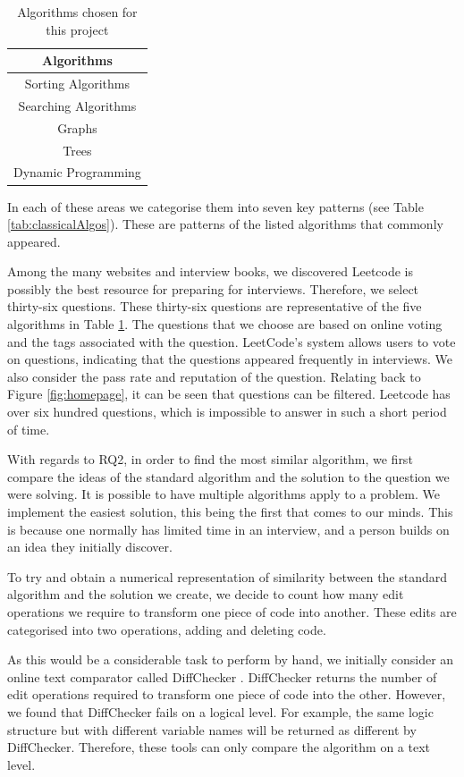 \documentclass[conference]{IEEEtran}
\begin{document}
\begin{table}[H]
\centering
	\begin{tabular}{| c | } \hline
		  {\bf Algorithms} \\ \hline
		Sorting Algorithms\\ \hline
		Searching Algorithms\\ \hline
		Graphs  \\ \hline
		Trees  \\ \hline
		Dynamic Programming \\ \hline
	\end{tabular}
	\caption{Algorithms chosen for this project}
	\label{tab:fiveareas}
\end{table}
In each of these areas we categorise them into seven key patterns (see Table \ref{tab:classicalAlgos}). These are patterns of the listed algorithms that commonly appeared.
\par Among the many websites and interview books, we discovered Leetcode is possibly the best resource for preparing for interviews. Therefore, we select thirty-six questions. These thirty-six questions are representative of the five algorithms in Table \ref{tab:fiveareas}. The questions that we choose are based on online voting and the tags associated with the question. LeetCode's system allows users to vote on questions, indicating that the questions appeared frequently in interviews. We also consider the pass rate and reputation of the question. Relating back to Figure \ref{fig:homepage}, it can be seen that questions can be filtered. Leetcode has over six hundred questions, which is impossible to answer in such a short period of time. 
\par With regards to RQ2, in order to find the most similar algorithm, we first compare the ideas of the standard algorithm and the solution to the question we were solving. It is possible to have multiple algorithms apply to a problem. We implement the easiest solution, this being the first that comes to our minds. This is because one normally has limited time in an interview, and a person builds on an idea they initially discover.
\par To try and obtain a numerical representation of similarity between the standard algorithm and the solution we create, we decide to count how many edit operations we require to transform one piece of code into another. These edits are categorised into two operations, adding and deleting code.
\par As this would be a considerable task to perform by hand, we initially consider an online text comparator called DiffChecker \cite{diff}. DiffChecker returns the number of edit operations required to transform one piece of code into the other. However, we found that DiffChecker fails on a logical level. For example, the same logic structure but with different variable names will be returned as different by DiffChecker. Therefore, these tools can only compare the algorithm on a text level. 
\end{document}
